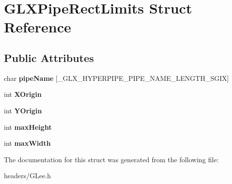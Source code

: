 \hypertarget{struct_g_l_x_pipe_rect_limits}{\section{G\+L\+X\+Pipe\+Rect\+Limits Struct Reference}
\label{struct_g_l_x_pipe_rect_limits}
}
\subsection*{Public Attributes}
\begin{DoxyCompactItemize}
\item 
\hypertarget{struct_g_l_x_pipe_rect_limits_ab41db17dccd6adefcf78a264f9139a63}{char {\bfseries pipe\+Name} \mbox{[}\+\_\+\+G\+L\+X\+\_\+\+H\+Y\+P\+E\+R\+P\+I\+P\+E\+\_\+\+P\+I\+P\+E\+\_\+\+N\+A\+M\+E\+\_\+\+L\+E\+N\+G\+T\+H\+\_\+\+S\+G\+I\+X\mbox{]}}\label{struct_g_l_x_pipe_rect_limits_ab41db17dccd6adefcf78a264f9139a63}

\item 
\hypertarget{struct_g_l_x_pipe_rect_limits_a3e5a965059d9f5d2ca42acd35af5bb9b}{int {\bfseries X\+Origin}}\label{struct_g_l_x_pipe_rect_limits_a3e5a965059d9f5d2ca42acd35af5bb9b}

\item 
\hypertarget{struct_g_l_x_pipe_rect_limits_a50e06bcf0dae95854be7d93a515199e9}{int {\bfseries Y\+Origin}}\label{struct_g_l_x_pipe_rect_limits_a50e06bcf0dae95854be7d93a515199e9}

\item 
\hypertarget{struct_g_l_x_pipe_rect_limits_a27572e499c0d3280031c2ad8e387c0c1}{int {\bfseries max\+Height}}\label{struct_g_l_x_pipe_rect_limits_a27572e499c0d3280031c2ad8e387c0c1}

\item 
\hypertarget{struct_g_l_x_pipe_rect_limits_a8662c7a712b30620e25fc994adf337a1}{int {\bfseries max\+Width}}\label{struct_g_l_x_pipe_rect_limits_a8662c7a712b30620e25fc994adf337a1}

\end{DoxyCompactItemize}


The documentation for this struct was generated from the following file\+:\begin{DoxyCompactItemize}
\item 
headers/G\+Lee.\+h\end{DoxyCompactItemize}
